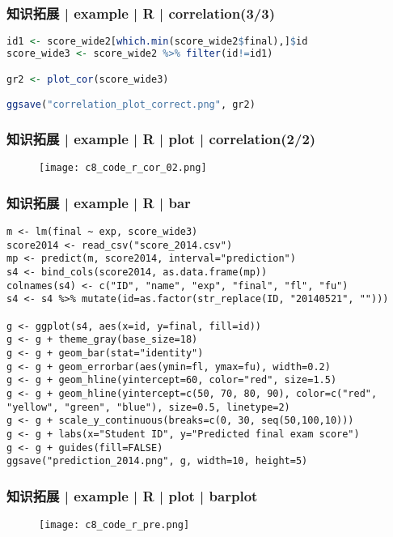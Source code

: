 \begin{frame}[fragile]
  \frametitle{知识拓展 | example | R | correlation(3/3)}
\begin{lstlisting}[language=r]
id1 <- score_wide2[which.min(score_wide2$final),]$id
score_wide3 <- score_wide2 %>% filter(id!=id1)

gr2 <- plot_cor(score_wide3)

ggsave("correlation_plot_correct.png", gr2)
\end{lstlisting}
\end{frame}

\begin{frame}
  \frametitle{知识拓展 | example | R | plot | correlation(2/2)}
  \begin{figure}
    \centering
    \texttt{[image: c8\_code\_r\_cor\_02.png]}
  \end{figure}
\end{frame}

\begin{frame}[fragile]
  \frametitle{知识拓展 | example | R | bar}
\begin{lstlisting}[basicstyle=\scriptsize\tt,numberstyle=\tiny]
m <- lm(final ~ exp, score_wide3)
score2014 <- read_csv("score_2014.csv")
mp <- predict(m, score2014, interval="prediction")
s4 <- bind_cols(score2014, as.data.frame(mp))
colnames(s4) <- c("ID", "name", "exp", "final", "fl", "fu")
s4 <- s4 %>% mutate(id=as.factor(str_replace(ID, "20140521", "")))

g <- ggplot(s4, aes(x=id, y=final, fill=id))
g <- g + theme_gray(base_size=18)
g <- g + geom_bar(stat="identity")
g <- g + geom_errorbar(aes(ymin=fl, ymax=fu), width=0.2)
g <- g + geom_hline(yintercept=60, color="red", size=1.5)
g <- g + geom_hline(yintercept=c(50, 70, 80, 90), color=c("red", "yellow", "green", "blue"), size=0.5, linetype=2)
g <- g + scale_y_continuous(breaks=c(0, 30, seq(50,100,10)))
g <- g + labs(x="Student ID", y="Predicted final exam score")
g <- g + guides(fill=FALSE)
ggsave("prediction_2014.png", g, width=10, height=5)
\end{lstlisting}
\end{frame}

\begin{frame}
  \frametitle{知识拓展 | example | R | plot | barplot}
  \begin{figure}
    \centering
    \texttt{[image: c8\_code\_r\_pre.png]}
  \end{figure}
\end{frame}




